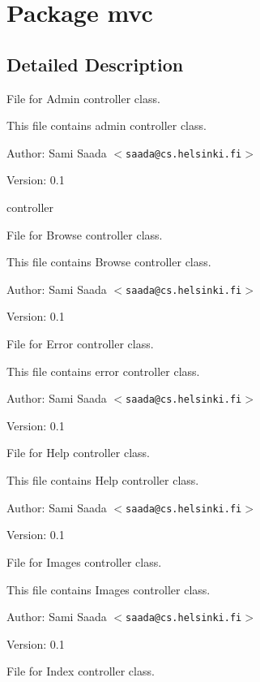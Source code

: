 \section{Package mvc}
\label{namespacemvc}




\subsection{Detailed Description}
File for Admin controller class.

This file contains admin controller class. \begin{Desc}
\item[Author:]Sami Saada $<${\tt saada@cs.helsinki.fi}$>$ \end{Desc}
\begin{Desc}
\item[Version:]0.1\end{Desc}
controller

File for Browse controller class.

This file contains Browse controller class. \begin{Desc}
\item[Author:]Sami Saada $<${\tt saada@cs.helsinki.fi}$>$ \end{Desc}
\begin{Desc}
\item[Version:]0.1\end{Desc}
File for Error controller class.

This file contains error controller class. \begin{Desc}
\item[Author:]Sami Saada $<${\tt saada@cs.helsinki.fi}$>$ \end{Desc}
\begin{Desc}
\item[Version:]0.1\end{Desc}
File for Help controller class.

This file contains Help controller class. \begin{Desc}
\item[Author:]Sami Saada $<${\tt saada@cs.helsinki.fi}$>$ \end{Desc}
\begin{Desc}
\item[Version:]0.1\end{Desc}
File for Images controller class.

This file contains Images controller class. \begin{Desc}
\item[Author:]Sami Saada $<${\tt saada@cs.helsinki.fi}$>$ \end{Desc}
\begin{Desc}
\item[Version:]0.1\end{Desc}
File for Index controller class.

